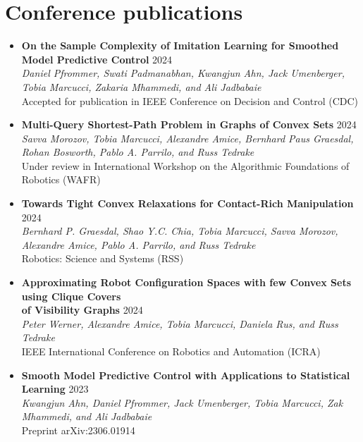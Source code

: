 \documentclass[11pt,a4paper,sans]{moderncv}
\begin{document}
\section{Conference publications}

\vspace{5pt}

\begin{itemize}
	
\item \textbf{On the Sample Complexity of Imitation Learning for Smoothed Model Predictive Control} \hfill 2024 \\
\textit{Daniel Pfrommer, Swati Padmanabhan, Kwangjun Ahn, Jack Umenberger, Tobia Marcucci, Zakaria Mhammedi, and Ali Jadbabaie} \\
Accepted for publication in IEEE Conference on Decision and Control (CDC)
	
\item \textbf{Multi-Query Shortest-Path Problem in Graphs of Convex Sets} \hfill 2024 \\
\textit{Savva Morozov, Tobia Marcucci, Alexandre Amice, Bernhard Paus Graesdal,  Rohan Bosworth,  Pablo A. Parrilo, and Russ Tedrake} \\
Under review in International Workshop on the Algorithmic Foundations of Robotics (WAFR)

\item \textbf{Towards Tight Convex Relaxations for Contact-Rich Manipulation} \hfill 2024 \\
\textit{Bernhard P. Graesdal, Shao Y.C. Chia, Tobia Marcucci, Savva Morozov, Alexandre Amice, Pablo A. Parrilo, and Russ Tedrake} \\
Robotics: Science and Systems (RSS)

\item \textbf{Approximating Robot Configuration Spaces with few Convex Sets using Clique Covers \\ of Visibility Graphs} \hfill 2024 \\
\textit{Peter Werner, Alexandre Amice, Tobia Marcucci, Daniela Rus, and Russ Tedrake} \\
IEEE International Conference on Robotics and Automation (ICRA)

\item \textbf{Smooth Model Predictive Control with Applications to Statistical Learning} \hfill 2023 \\
\textit{Kwangjun Ahn, Daniel Pfrommer, Jack Umenberger, Tobia Marcucci, Zak Mhammedi, and Ali Jadbabaie} \\
Preprint arXiv:2306.01914


\end{itemize}
\end{document}
